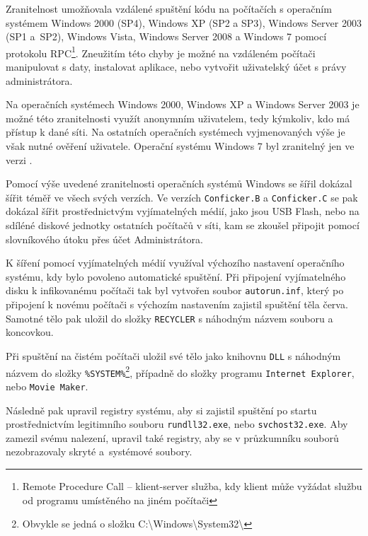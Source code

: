 \documentclass[a4paper,12pt]{article}
\begin{document}
Zranitelnost umožňovala vzdálené spuštění kódu na počítačích s operačním systémem Windows 2000 (SP4), Windows XP (SP2 a SP3), Windows Server 2003 (SP1 a~SP2), Windows Vista, Windows Server 2008 a Windows 7 pomocí protokolu RPC\footnote{Remote Procedure Call -- klient-server služba, kdy klient může vyžádat službu od programu umístěného na jiném počítači}. Zneužitím této chyby je možné na vzdáleném počítači manipulovat s daty, instalovat aplikace, nebo vytvořit uživatelský účet s právy administrátora.\cite{conficker-ms}\cite{conficker-malwarebytes}

Na operačních systémech Windows 2000, Windows XP a Windows Server 2003 je možné této zranitelnosti využít anonymním uživatelem, tedy kýmkoliv, kdo má přístup k dané síti. Na ostatních operačních systémech vyjmenovaných výše je však nutné ověření uživatele. Operační systému Windows 7 byl zranitelný jen ve verzi .\cite{conficker-ms}

Pomocí výše uvedené zranitelnosti operačních systémů Windows se šířil dokázal šířit téměř ve všech svých verzích. Ve verzích \texttt{Conficker.B} a \texttt{Conficker.C} se pak dokázal šířit prostřednictvým vyjímatelných médií, jako jsou USB Flash, nebo na sdíléné diskové jednotky ostatních počítačů v síti, kam se zkoušel připojit pomocí slovníkového útoku přes účet Administrátora.\cite{conficker-wiki}\cite{conficker-trendmicro}\cite{conficker-fsecure}

K šíření pomocí vyjímatelných médií využíval výchozího nastavení operačního systému, kdy bylo povoleno automatické spuštění. Při připojení vyjímatelného disku k infikovanému počítači tak byl vytvořen soubor \texttt{autorun.inf}, který po připojení k novému počítači s výchozím nastavením zajistil spuštění těla červa. Samotné tělo pak uložil do složky \texttt{RECYCLER} s náhodným názvem souboru a koncovkou.\cite{conficker-trendmicro}

Při spuštění na čistém počítači uložil své tělo jako knihovnu \texttt{DLL} s náhodným názvem do složky \texttt{\%SYSTEM\%}\footnote{Obvykle se jedná o složku C:\textbackslash Windows\textbackslash System32\textbackslash}, případně do složky programu \texttt{Internet Explorer}, nebo \texttt{Movie Maker}.\cite{conficker-trendmicro}

Následně pak upravil registry systému, aby si zajistil spuštění po startu prostřednictvím legitimního souboru \texttt{rundll32.exe}, nebo \texttt{svchost32.exe}. Aby zamezil svému nalezení, upravil také registry, aby se v průzkumníku souborů nezobrazovaly skryté a~systémové soubory.\cite{conficker-trendmicro}
\end{document}
